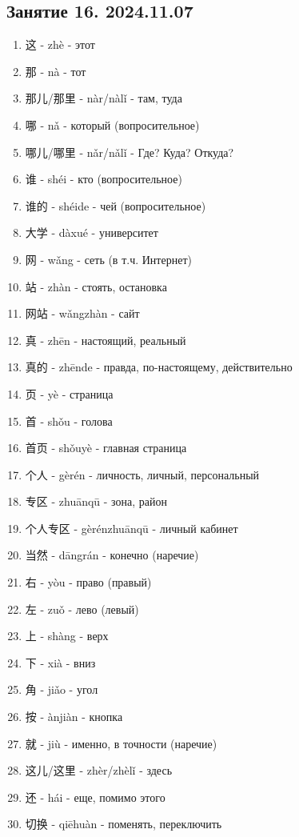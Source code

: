 \LARGE
\subsection{Занятие 16. 2024.11.07}
\begin{newwords}
	\begin{enumerate}\hfill
	\item 这 - zhè - этот
	\item 那 - nà - тот
	\item 那儿/那里 - nàr/nàlǐ - там, туда
	\item 哪 - nǎ - который (вопросительное)
	\item 哪儿/哪里 - nǎr/nǎlǐ - Где? Куда? Откуда?
	\item 谁 - shéi - кто (вопросительное)
	\item 谁的 - shéide - чей (вопросительное)
	\item 大学 - dàxué - университет
	\item 网 - wǎng - сеть (в т.ч. Интернет)
	\item 站 - zhàn - стоять, остановка
	\item 网站 - wǎngzhàn - сайт
	\item 真 - zhēn - настоящий, реальный
	\item 真的 - zhēnde - правда, по-настоящему, действительно
	\item 页 - yè - страница
	\item 首 - shǒu - голова
	\item 首页 - shǒuyè - главная страница
	\item 个人 - gèrén - личность, личный, персональный
	\item 专区 - zhuānqū - зона, район 
	\item 个人专区 - gèrénzhuānqū - личный кабинет
	\item 当然 - dāngrán - конечно (наречие)
	\item 右 - yòu - право (правый)
	\item 左 - zuǒ - лево (левый)
	\item 上 - shàng - верх
	\item 下 - xià - вниз
	\item 角 - jiǎo - угол
	\item 按 - ànjiàn - кнопка
	\item 就 - jiù - именно, в точности (наречие)
	\item 这儿/这里 - zhèr/zhèlǐ - здесь
	\item 还 - hái - еще, помимо этого
	\item 切换 - qiēhuàn - поменять, переключить

\end{enumerate}
\end{newwords}
